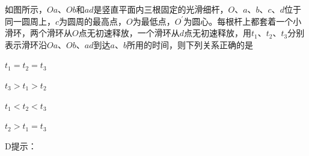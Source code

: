 如图所示，\(Oa\)、\(Ob\)和\(ad\)是竖直平面内三根固定的光滑细杆，\(O\)、\(a\)、\(b\)、\(c\)、\(d\)位于同一圆周上，\(c\)为圆周的最高点，\(O\)为最低点，\(O^\prime\)为圆心。每根杆上都套着一个小滑环，两个滑环从\(O\)点无初速释放，一个滑环从\(d\)点无初速释放，用\(t_1\)、\(t_2\)、\(t_3\)分别表示滑环沿\(Oa\)、\(Ob\)、\(ad\)到达\(a\)、\(b\)所用的时间，则下列关系正确的是\paren[]

\begin{choices}
	\item \(t_1 = t_2 = t_3\)
	\item \(t_3 > t_1 > t_2\)
	\item \(t_1 < t_2 < t_3\)
	\item \(t_2 > t_1 = t_3\)
\end{choices}
\begin{answer}
    D\qquad 提示：
\end{answer}